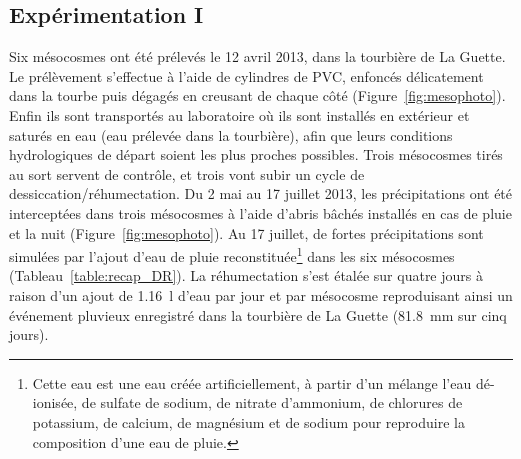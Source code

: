 \subsection{Expérimentation I}
Six mésocosmes ont été prélevés le 12 avril 2013, dans la tourbière de La Guette.
Le prélèvement s'effectue à l'aide de cylindres de PVC, enfoncés délicatement dans la tourbe puis dégagés en creusant de chaque côté (Figure~\ref{fig:mesophoto}).
Enfin ils sont transportés au laboratoire où ils sont installés en extérieur et saturés en eau (eau prélevée dans la tourbière), afin que leurs conditions hydrologiques de départ soient les plus proches possibles.
Trois mésocosmes tirés au sort servent de contrôle, et trois vont subir un cycle de dessiccation/réhumectation.
Du 2 mai au 17 juillet 2013, les précipitations ont été interceptées dans trois mésocosmes à l'aide d'abris bâchés installés en cas de pluie et la nuit (Figure~\ref{fig:mesophoto}).
Au 17 juillet, de fortes précipitations sont simulées par l'ajout d'eau de pluie reconstituée\footnote{Cette eau est une eau créée artificiellement, à partir d'un mélange l'eau dé-ionisée, de sulfate de sodium, de nitrate d'ammonium, de chlorures de potassium, de calcium, de magnésium et de sodium pour reproduire la composition d'une eau de pluie.} dans les six mésocosmes (Tableau~\ref{table:recap_DR}).
La réhumectation s'est étalée sur quatre jours à raison d'un ajout de \SI{1.16}{\litre} d'eau par jour et par mésocosme reproduisant ainsi un événement pluvieux enregistré dans la tourbière de La Guette (\SI{81.8}{\milli\metre} sur cinq jours).


